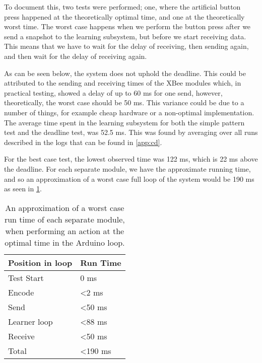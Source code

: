 To document this, two tests were performed; one, where the artificial button press happened at the theoretically optimal time, and one at the theoretically worst time. The worst case happens when we perform the button press after we send a snapshot to the learning subsystem, but before we start receiving data. This means that we have to wait for the delay of receiving, then sending again, and then wait for the delay of receiving again.

As can be seen below, the system does not uphold the deadline. This could be attributed to the sending and receiving times of the XBee modules which, in practical testing, showed a delay of up to 60 ms for one send, however, theoretically, the worst case should be 50 ms\cite{xbee_latency}. This variance could be due to a number of things, for example cheap hardware or a non-optimal implementation. The average time spent in the learning subsystem for both the simple pattern test and the deadline test, was 52.5 ms. This was found by averaging over all runs described in the logs that can be found in \cref{app:cd}.

For the best case test, the lowest observed time was 122 ms, which is 22 ms above the deadline. For each separate module, we have the approximate running time, and so an approximation of a worst case full loop of the system would be 190 ms as seen in \cref{Table:RunTimeAprox}.
\begin{center}
	\begin{table}[htbp]
	  \centering
	  \begin{tabular}{l l}
		\toprule
		Position in loop		& Run Time  \\ \midrule
		Test Start		        & 0 ms         \\ \midrule
		Encode 			        & <2 ms  	\\ \midrule
		Send   			        & <50 ms     \\ \midrule
		Learner loop 	        & <88 ms     \\ \midrule
		Receive 		        & <50 ms     \\ \midrule \midrule
		Total			        & <190 ms	    \\
                                            \bottomrule
	  \end{tabular}
	  \caption{An approximation of a worst case run time of each separate module, when performing an action at the optimal time in the Arduino loop.}\label{Table:RunTimeAprox}
	\end{table}
\end{center}

